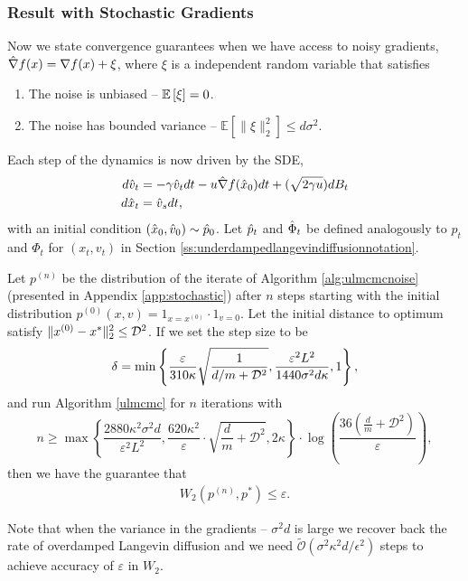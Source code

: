 \subsubsection{Result with Stochastic Gradients}\label{ss:stochasticgradient}
Now we state convergence guarantees when we have access to noisy gradients, $\hat{\nabla} f(x) = \nabla f(x) + \xi$, where $\xi$ is a independent random variable that satisfies
\begin{enumerate}
\item The noise is unbiased -- $\mathbb{E}\left[\xi\right]=0$.

\item The noise has bounded variance -- $\mathbb{E}[\|\xi\|_2^2]\leq d\sigma^2.$
\end{enumerate} 
Each step of the dynamics is now driven by the SDE,
\begin{align}
\label{e:discretelangevindiffusionwithnoise}
d\hat{v}_t &= -\gamma \hat{v}_t dt -u \hat{\nabla} f(\hat{x}_0) dt + (\sqrt{2\gamma u}) dB_t \\
d \hat{x}_t &= \hat{v}_s dt, \nonumber
\end{align}
with an initial condition $(\hat{x}_0,\hat{v}_0)\sim \hat{p}_0$.
Let $\hat{p}_t$ and $\hat{\Phi}_t$ be defined analogously to $p_t$ and $\Phi_t$ for $(x_t,v_t)$ in Section \ref{ss:underdampedlangevindiffusionnotation}.
\begin{theorem} \label{t:stochasticconvergence}
 Let $p^{(n)}$ be the distribution of the iterate of Algorithm \ref{alg:ulmcmcnoise} (presented in Appendix \ref{app:stochastic}) after $n$ steps starting with the initial distribution $p^{(0)}(x,v) =1_{x=x^{(0)}} \cdot 1_{v=0}$. Let the initial distance to optimum satisfy $  \lVert x^{(0)} - x^* \rVert_2^2 \le \mathcal{D}^2$. If we set the step size to be  
$$\delta = \min\left\{\frac{\varepsilon }{310\kappa} \sqrt{\frac{1}{d/m + \mathcal{D}^2}}, \frac{\varepsilon^2L^2}{1440 \sigma^2 d\kappa},1\right\}, $$
and run Algorithm \ref{ulmcmc} for $n$ iterations with 
$$n \ge \max\left\{\frac{2880\kappa^2\sigma^2 d}{\varepsilon^2 L^2},\frac{620\kappa^2}{\varepsilon}\cdot\sqrt{\frac{d}{m}+\mathcal{D}^2},2\kappa \right\} \cdot \log\left( \frac{36\left(\frac{d}{m}+\mathcal{D}^2 \right)}{\varepsilon}\right),$$
then we have the guarantee that 
\begin{align*}
W_2(p^{(n)} , p^*)\leq \varepsilon.
\end{align*}
\end{theorem}
\begin{remark} Note that when the variance in the gradients -- $\sigma^2d$ is large we recover back the rate of overdamped Langevin diffusion and we need $\tilde{\mathcal{O}}(\sigma^2 \kappa^2 d /\epsilon^2)$ steps to achieve accuracy of $\varepsilon$ in $W_2$.
\end{remark}